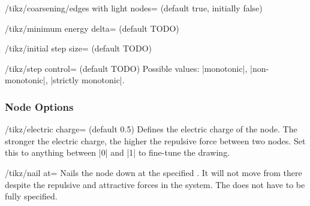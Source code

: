 \begin{key}{/tikz/coarsening/edges with light nodes=
  (default true, initially false)}
  \begin{codeexample}[]
  \end{codeexample}
\end{key}

\begin{key}{/tikz/minimum energy delta= (default TODO)}
  \begin{codeexample}[]
  \end{codeexample}
\end{key}

\begin{key}{/tikz/initial step size= (default TODO)}
  \begin{codeexample}[]
  \end{codeexample}
\end{key}

\begin{key}{/tikz/step control= (default TODO)}
  Possible values: |monotonic|, |non-monotonic|, |strictly monotonic|.
  \begin{codeexample}[]
  \end{codeexample}
\end{key}

\subsubsection{Node Options}

\begin{key}{/tikz/electric charge= (default 0.5)}
  Defines the electric charge of the node. The stronger the electric
  charge, the higher the repulsive force between two nodes. Set this to
  anything between |0| and |1| to fine-tune the drawing.
  \begin{codeexample}[] 
  \end{codeexample}
\end{key}

\begin{key}{/tikz/nail at=}
  Nails the node down at the specified . It will not
  move from there despite the repulsive and attractive forces in the
  system. The  does not have to be fully specified. 
  \begin{codeexample}[] 
  \end{codeexample}
\end{key}

